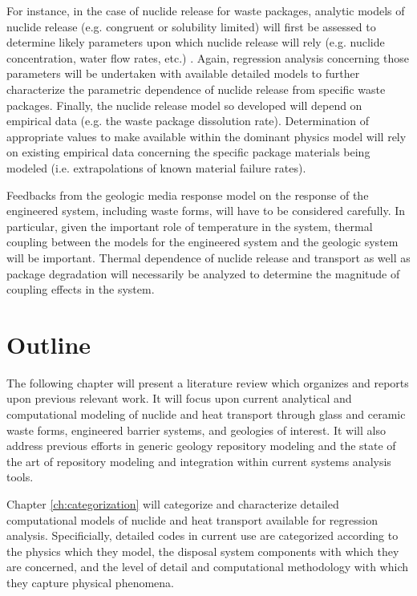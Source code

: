 For instance, in the case of nuclide release for waste packages, 
analytic models of nuclide release (e.g.  congruent or solubility 
limited) will first be assessed to determine likely parameters upon 
which nuclide release will rely (e.g.  nuclide concentration, water 
flow rates, etc.) \cite{ahn_congruent}.  Again, regression analysis 
concerning those parameters will be undertaken with available detailed 
models to further characterize the parametric dependence of nuclide 
release from specific waste packages.  Finally, the nuclide release 
model so developed will depend on empirical data (e.g. the waste 
package dissolution rate).  Determination of appropriate values to 
make available within the dominant physics model will rely on existing 
empirical data concerning the specific package materials being modeled 
(i.e.  extrapolations of known material failure rates).  

Feedbacks from the geologic media response model on the response of 
the engineered system, including waste forms, will have to be 
considered carefully.  In particular, given the important role of 
temperature in the system, thermal coupling between the models for the 
engineered system and the geologic system will be important. Thermal 
dependence of nuclide release and transport as well as package 
degradation will necessarily be analyzed to determine the magnitude of 
coupling effects in the system.


\section{Outline}

The following chapter will present a literature review which organizes 
and reports upon previous relevant work. It will focus upon current 
analytical and computational modeling of nuclide and heat transport 
through glass and ceramic waste forms, engineered barrier systems, and 
geologies of interest. It will also address previous efforts in 
generic geology repository modeling and the state of the art of 
repository modeling and integration within current systems analysis 
tools. 

Chapter \ref{ch:categorization} will categorize and characterize 
detailed computational models of nuclide and heat transport available 
for regression analysis. Specificially, detailed codes in current use 
are categorized according to the physics which they model, the 
disposal system components with which they are concerned, and the 
level of detail and computational methodology with which they capture 
physical phenomena. 

